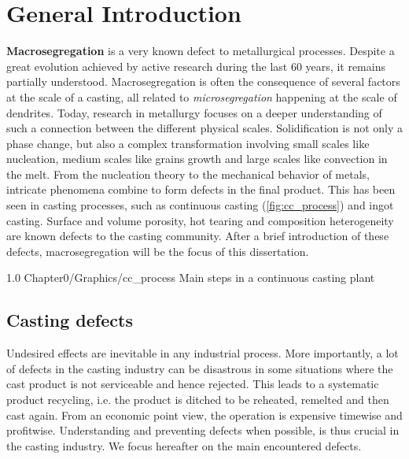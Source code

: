 \chapter{General Introduction}
\textbf{Macrosegregation} is a very known defect to metallurgical processes. Despite a great evolution achieved by active research during the last 60 years,
it remains partially understood. Macrosegregation is often  the consequence of several factors at the scale of a casting, all related to \emph{microsegregation} happening at the scale
of dendrites. Today, research in metallurgy focuses on a deeper understanding of such a connection between the different physical scales.
Solidification is not only a phase change, but also a complex transformation involving small scales like nucleation, medium scales
like grains growth and large scales like convection in the melt. From the nucleation theory to the mechanical behavior of metals, intricate phenomena combine to form defects in the final product. This has been seen in casting processes, such as continuous casting (\cref{fig:cc_process}) and ingot casting. Surface and volume porosity, hot tearing and composition heterogeneity are known defects to the casting community. After a brief introduction of these defects, macrosegregation will be the focus of this dissertation. 

\begin{figureth}
{1.0}
{Chapter0/Graphics/cc_process}
{Main steps in a continuous casting plant}
\label{fig:cc_process}
\end{figureth}
%
%
\section{Casting defects}
%
Undesired effects are inevitable in any industrial process. More importantly, 
a lot of defects in the casting industry can be disastrous in some situations 
where the cast product is not serviceable and hence rejected. This leads to a 
systematic product recycling, i.e. the product is ditched to be reheated, remelted 
and then cast again. From an economic point view, the operation is expensive timewise 
and profitwise. Understanding and preventing defects when possible, is thus crucial in 
the casting industry. We focus hereafter on the main encountered defects.
%
%
